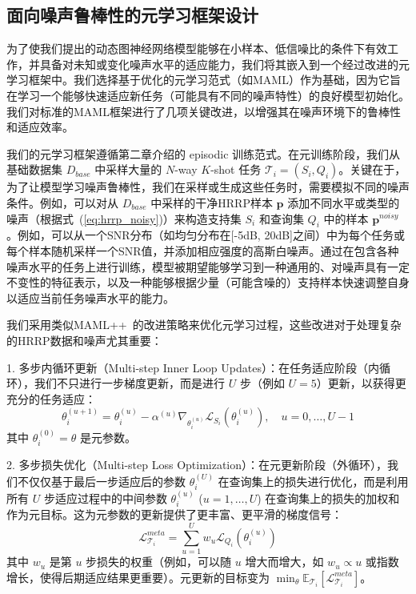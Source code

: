 \subsection{面向噪声鲁棒性的元学习框架设计}
\label{subsec:meta_learning_noise_robust}

为了使我们提出的动态图神经网络模型能够在小样本、低信噪比的条件下有效工作，并具备对未知或变化噪声水平的适应能力，我们将其嵌入到一个经过改进的元学习框架中。我们选择基于优化的元学习范式（如MAML）作为基础，因为它旨在学习一个能够快速适应新任务（可能具有不同的噪声特性）的良好模型初始化。我们对标准的MAML框架进行了几项关键改进，以增强其在噪声环境下的鲁棒性和适应效率。

我们的元学习框架遵循第二章介绍的 episodic 训练范式。在元训练阶段，我们从基础数据集 $D_{base}$ 中采样大量的 $N$-way $K$-shot 任务 $\mathcal{T}_i = (S_i, Q_i)$。关键在于，为了让模型学习噪声鲁棒性，我们在采样或生成这些任务时，需要模拟不同的噪声条件。例如，可以对从 $D_{base}$ 中采样的干净HRRP样本 $\mathbf{p}$ 添加不同水平或类型的噪声（根据式~(\ref{eq:hrrp_noisy})）来构造支持集 $S_i$ 和查询集 $Q_i$ 中的样本 $\mathbf{p}^{noisy}$。例如，可以从一个SNR分布（如均匀分布在[-5dB, 20dB]之间）中为每个任务或每个样本随机采样一个SNR值，并添加相应强度的高斯白噪声。通过在包含各种噪声水平的任务上进行训练，模型被期望能够学习到一种通用的、对噪声具有一定不变性的特征表示，以及一种能够根据少量（可能含噪的）支持样本快速调整自身以适应当前任务噪声水平的能力。

我们采用类似MAML++~\cite{antoniou_how_2018, yao_model-agnostic_2021, zhou_task_2021, raghu_rapid_2020}的改进策略来优化元学习过程，这些改进对于处理复杂的HRRP数据和噪声尤其重要：

1.  多步内循环更新（Multi-step Inner Loop Updates）：在任务适应阶段（内循环），我们不只进行一步梯度更新，而是进行 $U$ 步（例如 $U=5$）更新，以获得更充分的任务适应：
    \begin{equation}
        \theta_i^{(u+1)} = \theta_i^{(u)} - \alpha^{(u)} \nabla_{\theta_i^{(u)}} \mathcal{L}_{S_i}(\theta_i^{(u)}), \quad u=0, \dots, U-1
        \label{eq:multi_step_inner_update}
    \end{equation}
    其中 $\theta_i^{(0)} = \theta$ 是元参数。

2.  多步损失优化（Multi-step Loss Optimization）：在元更新阶段（外循环），我们不仅仅基于最后一步适应后的参数 $\theta_i^{(U)}$ 在查询集上的损失进行优化，而是利用所有 $U$ 步适应过程中的中间参数 $\theta_i^{(u)}$ ($u=1, \dots, U$) 在查询集上的损失的加权和作为元目标。这为元参数的更新提供了更丰富、更平滑的梯度信号：
    \begin{equation}
        \mathcal{L}_{\mathcal{T}_i}^{meta} = \sum_{u=1}^{U} w_u \mathcal{L}_{Q_i}(\theta_i^{(u)})
        \label{eq:multi_step_loss}
    \end{equation}
    其中 $w_u$ 是第 $u$ 步损失的权重（例如，可以随 $u$ 增大而增大，如 $w_u \propto u$ 或指数增长，使得后期适应结果更重要）。元更新的目标变为 $\min_{\theta} \mathbb{E}_{\mathcal{T}_i} [\mathcal{L}_{\mathcal{T}_i}^{meta}]$。

